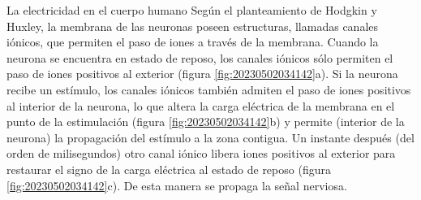\begin{sectionbox}{La electricidad en el cuerpo humano}
    Según el planteamiento de Hodgkin y Huxley, la membrana de las neuronas poseen estructuras, llamadas
    canales iónicos, que permiten el paso de iones a través de la membrana. Cuando la neurona se encuentra en
    estado de reposo, los canales iónicos sólo permiten el
    paso de iones positivos al exterior (figura \ref{fig:20230502034142}a). Si la
    neurona recibe un estímulo, los canales iónicos también
    admiten el paso de iones positivos al interior de la neurona, lo que altera la carga eléctrica de la membrana
    en el punto de la estimulación (figura \ref{fig:20230502034142}b) y permite
    (interior de la neurona) la propagación del estímulo a la zona contigua.
    Un instante después (del orden de milisegundos) otro canal iónico libera iones positivos al exterior para restaurar
    el signo de la carga eléctrica al estado de reposo (figura \ref{fig:20230502034142}c). De esta manera se propaga la señal nerviosa.


\end{sectionbox}

